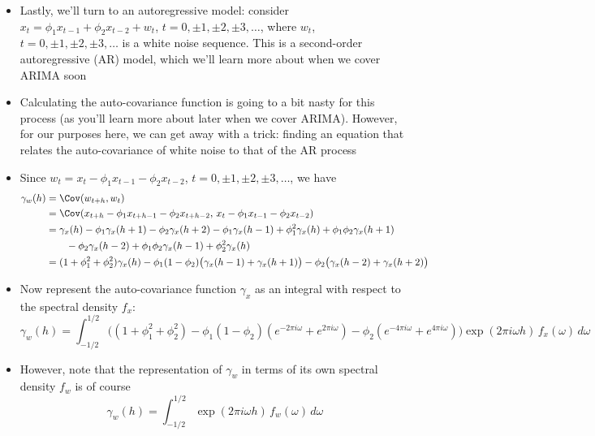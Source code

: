 \documentclass{article}
\begin{document}
\begin{itemize}
\item Lastly, we'll turn to an autoregressive model: consider $x_t = \phi_1
  x_{t-1} + \phi_2 x_{t-2} + w_t$, $t = 0, \pm 1, \pm 2, \pm 3, \dots$, where
  $w_t$, $t = 0, \pm 1, \pm 2, \pm 3, \dots$ is a white noise sequence. This is
  a second-order autoregressive (AR) model, which we'll learn more about when we
  cover ARIMA soon 

\item Calculating the auto-covariance function is going to a bit nasty for this 
  process (as you'll learn more about later when we cover ARIMA). However, for
  our purposes here, we can get away with a trick: finding an equation that
  relates the auto-covariance of white noise to that of the AR process 

\item Since $w_t = x_t - \phi_1 x_{t-1} - \phi_2 x_{t-2}$, $t = 0, \pm 1, \pm 2,
  \pm 3, \dots$, we have 
  \begin{align*}
  \gamma_w(h) &= \Cov(w_{t+h}, w_t) \\
  &= \Cov(x_{t+h} - \phi_1 x_{t+h-1} -  \phi_2 x_{t+h-2}, \,
    x_t - \phi_1 x_{t-1} - \phi_2 x_{t-2}) \\
  &= \gamma_x(h) - \phi_1 \gamma_x(h+1) - \phi_2 \gamma_x(h+2) 
    - \phi_1 \gamma_x(h-1) + \phi_1^2 \gamma_x(h) + \phi_1 \phi_2 
    \gamma_x(h+1) \\ 
    &\qquad - \phi_2 \gamma_x(h-2) +  \phi_1 \phi_2 \gamma_x(h-1) + \phi_2^2
    \gamma_x(h) \\
    &= (1+\phi_1^2+\phi_2^2) \gamma_x(h)  
      -\phi_1(1-\phi_2) \big( \gamma_x(h-1) + \gamma_x(h+1) \big) 
      - \phi_2 \big( \gamma_x(h-2) + \gamma_x(h+2) \big)  
  \end{align*}

\item Now represent the auto-covariance function $\gamma_x$ as an integral with
  respect to the spectral density $f_x$:
  \[
  \gamma_w(h) = \int_{-1/2}^{1/2} \Big( (1+\phi_1^2+\phi_2^2)  
  - \phi_1(1-\phi_2) (e^{-2\pi i \omega} + e^{2\pi i \omega})
  - \phi_2 (e^{-4\pi i \omega} + e^{4\pi i \omega}) \Big) \exp(2\pi i \omega
  h) \, f_x(\omega) \, d\omega
  \]

\item However, note that the representation of $\gamma_w$ in terms of its own
  spectral density $f_w$ is of course
  \[
  \gamma_w(h) = \int_{-1/2}^{1/2} \exp(2\pi i \omega h) \, f_w(\omega) \,
  d\omega 
  \]


\end{itemize}
\end{document}
